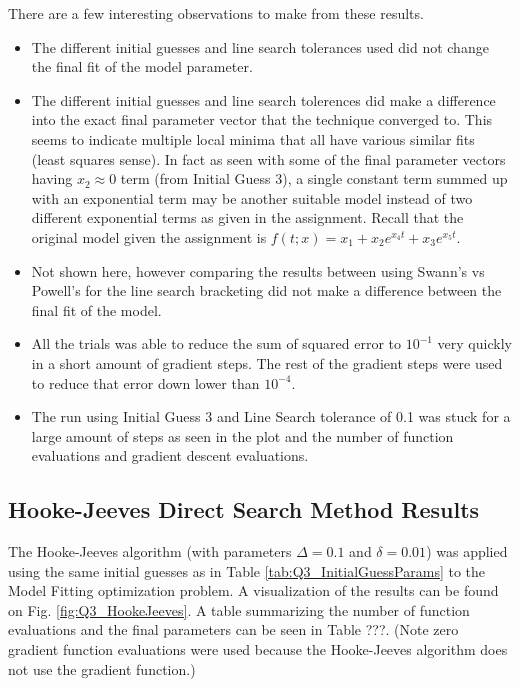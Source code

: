 \documentclass{article}
\begin{document}
    There are a few interesting observations to make from these results.
    \begin{itemize}
        \item The different initial guesses and line search tolerances used did not change the final fit of the model parameter. 
        \item The different initial guesses and line search tolerences did make a difference into the exact final parameter vector that the technique converged to. This seems to indicate multiple local minima that all have various similar fits (least squares sense). In fact as seen with some of the final parameter vectors having $x_2 \approx 0$ term (from Initial Guess 3), a single constant term summed up with an exponential term may be another suitable model instead of two different exponential terms as given in the assignment. Recall that the original model given the assignment is $f(t; x) = x_1 + x_2 e^{x_4 t} +x_3 e^ {x_5 t}$.
        \item Not shown here, however comparing the results between using Swann's vs Powell's for the line search bracketing did not make a difference between the final fit of the model.
        \item All the trials was able to reduce the sum of squared error to $10^{-1}$ very quickly in a short amount of gradient steps. The rest of the gradient steps were used to reduce that error down lower than $10^{-4}$.
        \item The run using Initial Guess 3 and Line Search tolerance of 0.1 was stuck for a large amount of steps as seen in the plot and the number of function evaluations and gradient descent evaluations.
    \end{itemize}
    
    \subsection{Hooke-Jeeves Direct Search Method Results}

    The Hooke-Jeeves algorithm (with parameters $\Delta = 0.1$ and $\delta = 0.01$) was applied using the same initial guesses as in Table \ref{tab:Q3_InitialGuessParams} to the Model Fitting optimization problem. 
    A visualization of the results can be found on Fig. \ref{fig:Q3_HookeJeeves}. A table summarizing the number of function evaluations and the final parameters can be seen in Table ???. (Note zero gradient function evaluations were used because the Hooke-Jeeves algorithm does not use the gradient function.)
\end{document}
